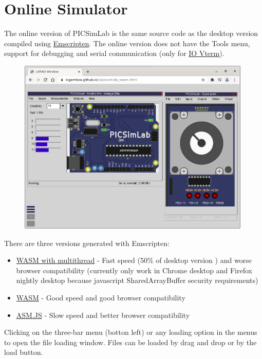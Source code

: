 \chapter{Online Simulator}

The online version of PICSimLab is the same source code as the desktop version compiled using 
\href{https://emscripten.org/}{Emscripten}. The online version does not have the Tools menu, support for 
debugging and serial communication (only for \hyperlink{def:vterm}{IO Vterm}). 

\begin{figure}[H]
\center
\includegraphics[width=0.99\textwidth]{img/online.png} 
\end{figure} 

There are three versions generated with Emscripten: 

\begin{itemize}
\item \href{https://lcgamboa.github.io/js/picsimlab_mt.html}{WASM with multithread} - Fast speed (50\% of desktop version )
and worse browser compatibility (currently only work in Chrome desktop and Firefox nightly desktop because 
javascript SharedArrayBuffer security requirements)
\item \href{https://lcgamboa.github.io/js/picsimlab_wasm.html}{WASM} - Good speed and good browser compatibility
\item \href{https://lcgamboa.github.io/js/picsimlab_asmjs.html}{ASM.JS} - Slow speed and better browser compatibility
\end{itemize}

Clicking on the three-bar menu (botton left) or any loading option in the menus to open the 
file loading window.
Files can be loaded by drag and drop or by the load button. 

